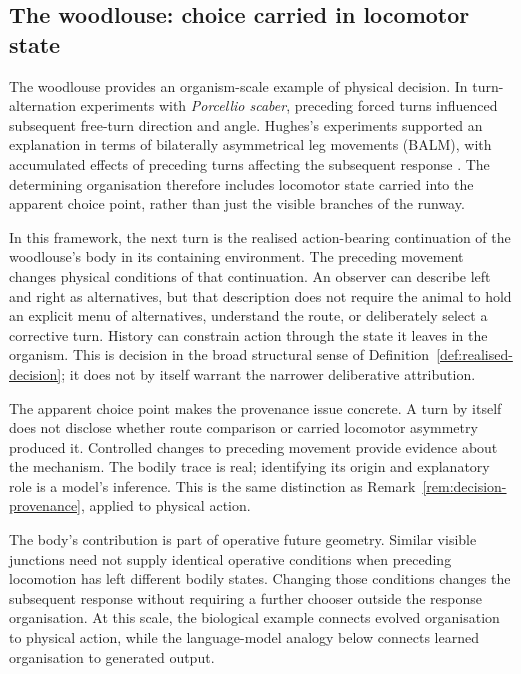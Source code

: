 \documentclass[11pt,a4paper]{article}
\theoremstyle{remark}
\begin{document}
\subsection{The woodlouse: choice carried in locomotor state}\label{sec:woodlouse}

The woodlouse provides an organism-scale example of physical decision.
In turn-alternation experiments with \emph{Porcellio scaber}, preceding forced
turns influenced subsequent free-turn direction and angle. Hughes's
experiments supported an explanation in terms of bilaterally asymmetrical
leg movements (BALM), with accumulated effects of preceding turns affecting
the subsequent response \citep{hughes1985}. The determining organisation
therefore includes locomotor state carried into the apparent choice point,
rather than just the visible branches of the runway.

In this framework, the next turn is the realised action-bearing continuation
of the woodlouse's body in its containing environment. The preceding movement
changes physical conditions of that continuation. An observer can describe
left and right as alternatives, but that description does not require the
animal to hold an explicit menu of alternatives, understand the route, or
deliberately select a corrective turn. History can constrain action through
the state it leaves in the organism. This is decision in the broad structural
sense of Definition~\ref{def:realised-decision}; it does not by itself warrant
the narrower deliberative attribution.

The apparent choice point makes the provenance issue concrete. A turn by
itself does not disclose whether route comparison or carried locomotor
asymmetry produced it. Controlled changes to preceding movement provide
evidence about the mechanism. The bodily trace is real; identifying its
origin and explanatory role is a model's inference. This is the same
distinction as Remark~\ref{rem:decision-provenance}, applied to physical action.

The body's contribution is part of operative future geometry. Similar
visible junctions need not supply identical operative conditions when
preceding locomotion has left different bodily states. Changing those
conditions changes the subsequent response without requiring a further
chooser outside the response organisation. At this scale, the biological
example connects evolved organisation to physical action, while the
language-model analogy below connects learned organisation to generated
output.
\end{document}

